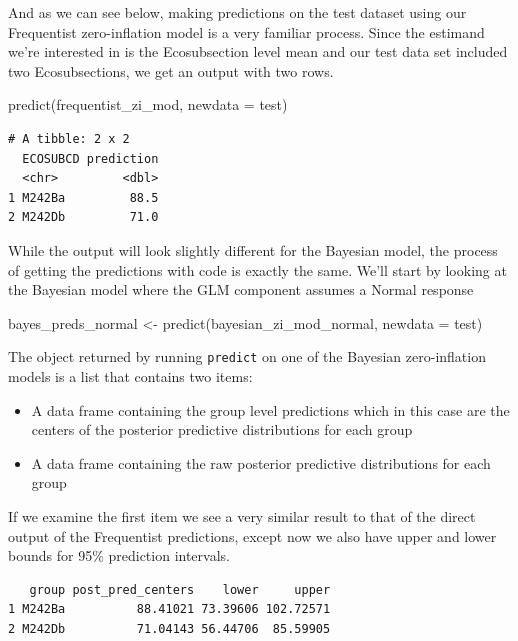 \documentclass[12pt,twoside]{reedthesis}
\newenvironment{Shaded}{\begin{snugshade}}{\end{snugshade}}
\newcommand{\AttributeTok}[1]{\textcolor[rgb]{0.77,0.63,0.00}{#1}}
\newcommand{\FunctionTok}[1]{\textcolor[rgb]{0.00,0.00,0.00}{#1}}
\newcommand{\NormalTok}[1]{#1}
\newcommand{\OtherTok}[1]{\textcolor[rgb]{0.56,0.35,0.01}{#1}}
\newcommand{\SpecialCharTok}[1]{\textcolor[rgb]{0.00,0.00,0.00}{#1}}
\providecommand{\tightlist}{%
  \setlength{\itemsep}{0pt}\setlength{\parskip}{0pt}}
\begin{document}
And as we can see below, making predictions on the test dataset using our Frequentist zero-inflation model is a very familiar process. Since the estimand we're interested in is the Ecosubsection level mean and our test data set included two Ecosubsections, we get an output with two rows.
\begin{Shaded}
\begin{Highlighting}[]
\FunctionTok{predict}\NormalTok{(frequentist\_zi\_mod, }\AttributeTok{newdata =}\NormalTok{ test)}
\end{Highlighting}
\end{Shaded}
\begin{verbatim}
# A tibble: 2 x 2
  ECOSUBCD prediction
  <chr>         <dbl>
1 M242Ba         88.5
2 M242Db         71.0
\end{verbatim}
While the output will look slightly different for the Bayesian model, the process of getting the predictions with code is exactly the same. We'll start by looking at the Bayesian model where the GLM component assumes a Normal response
\begin{Shaded}
\begin{Highlighting}[]
\NormalTok{bayes\_preds\_normal }\OtherTok{\textless{}{-}} \FunctionTok{predict}\NormalTok{(bayesian\_zi\_mod\_normal, }\AttributeTok{newdata =}\NormalTok{ test)}
\end{Highlighting}
\end{Shaded}
The object returned by running \texttt{predict} on one of the Bayesian zero-inflation models is a list that contains two items:
\begin{itemize}
\tightlist
\item
  A data frame containing the group level predictions which in this case are the centers of the posterior predictive distributions for each group
\item
  A data frame containing the raw posterior predictive distributions for each group
\end{itemize}
If we examine the first item we see a very similar result to that of the direct output of the Frequentist predictions, except now we also have upper and lower bounds for 95\% prediction intervals.
\begin{Shaded}
\end{Shaded}
\begin{verbatim}
   group post_pred_centers    lower     upper
1 M242Ba          88.41021 73.39606 102.72571
2 M242Db          71.04143 56.44706  85.59905
\end{verbatim}
\end{document}

